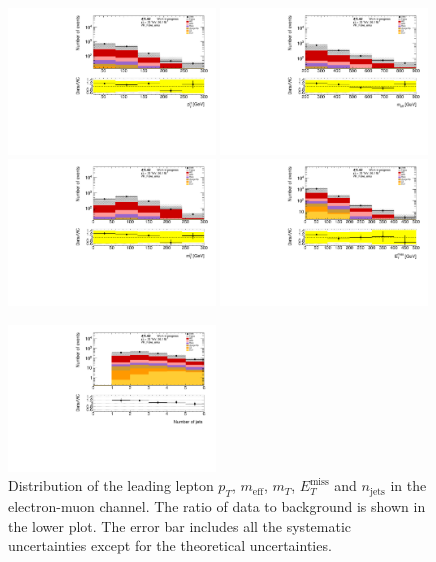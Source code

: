 \begin{figure}[htbp]
\includegraphics[width=0.49\textwidth]{data/plot/Fake_VR/pt1_VR_Fake_emu}
\includegraphics[width=0.49\textwidth]{data/plot/Fake_VR/meff_VR_Fake_emu}\\
\includegraphics[width=0.49\textwidth]{data/plot/Fake_VR/mt1_VR_Fake_emu}
\includegraphics[width=0.49\textwidth]{data/plot/Fake_VR/MET_VR_Fake_emu}\\
\begin{center}
\includegraphics[width=0.49\textwidth]{data/plot/Fake_VR/nJet_VR_Fake_emu}
\end{center}
\caption{Distribution of the  leading lepton $p_T$, $m_{\text{eff}}$, $m_T$, $E_{T}^{\text{miss}}$ and $n_{\text{jets}}$ in the electron-muon channel. The ratio of data to background is shown in the lower plot. The error bar includes all the systematic uncertainties except for the theoretical uncertainties.}
\label{fig:VRSS_fake_emu}
\end{figure}
